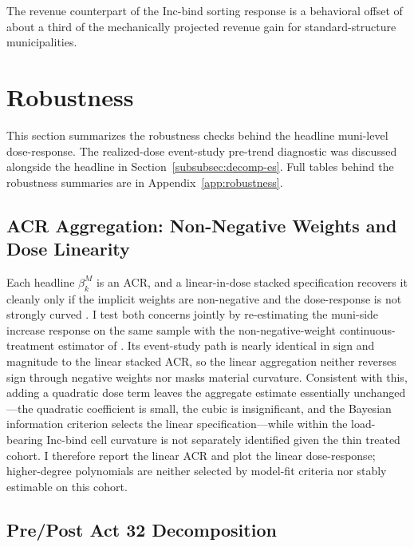 \documentclass[12pt]{article}
\begin{document}
The revenue counterpart of the Inc-bind sorting response is a behavioral
offset of about a third of the mechanically projected revenue gain for
standard-structure municipalities.

\section{Robustness}
\label{sec:robustness}

This section summarizes the robustness checks behind the headline
muni-level dose-response. The realized-dose event-study pre-trend
diagnostic was discussed alongside the headline in
Section~\ref{subsubsec:decomp-es}. Full tables behind the
robustness summaries are in Appendix~\ref{app:robustness}.

\subsection{ACR Aggregation: Non-Negative Weights and Dose Linearity}
\label{subsec:rob-acr}

Each headline $\beta^M_k$ is an ACR, and a linear-in-dose stacked
specification recovers it cleanly only if the implicit weights are
non-negative and the dose-response is not strongly curved
\citep{dechaisemartin2024}. I test both concerns jointly by re-estimating the
muni-side increase response on the same sample with the non-negative-weight
continuous-treatment estimator of
\citet{chaisemartinUsingDid_multiplegt_dynEstimate2025}. Its event-study path
is nearly identical in sign and magnitude to the linear stacked ACR, so the
linear aggregation neither reverses sign through negative weights nor masks
material curvature. Consistent with this, adding a quadratic dose term leaves
the aggregate estimate essentially unchanged---the quadratic coefficient is
small, the cubic is insignificant, and the Bayesian information criterion
selects the linear specification---while within the load-bearing Inc-bind cell
curvature is not separately identified given the thin treated cohort. I
therefore report the linear ACR and plot the linear dose-response; higher-degree
polynomials are neither selected by model-fit criteria nor stably estimable on
this cohort.

\subsection{Pre/Post Act 32 Decomposition}
\label{subsec:rob-act32}
\end{document}
